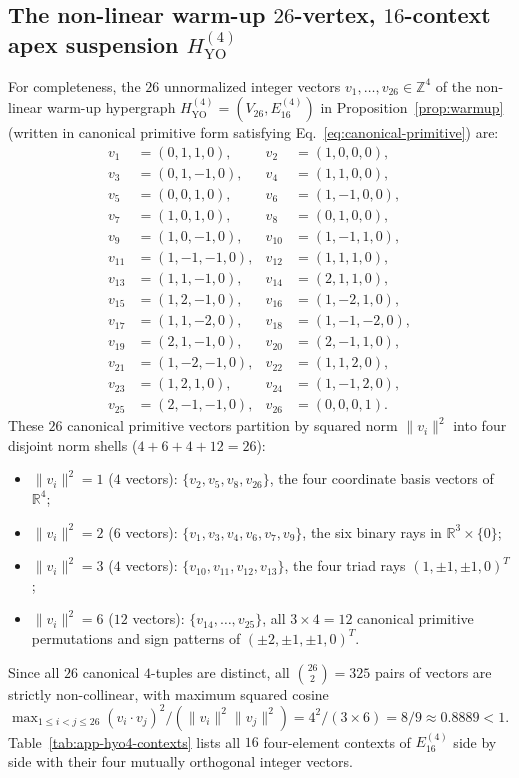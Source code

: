 \documentclass[
  aps,
  pra,
  reprint,
  superscriptaddress,
  amsmath,
  amssymb,
  nofootinbib,
  floatfix
]{revtex4-2}
\theoremstyle{definition}
\theoremstyle{remark}
\newcommand{\R}{\mathbb{R}}
\newcommand{\YO}{\mathrm{YO}}
\begin{document}
\subsection{The non-linear warm-up \texorpdfstring{$26$}{26}-vertex, \texorpdfstring{$16$}{16}-context apex suspension \texorpdfstring{$H_{\YO}^{(4)}$}{H\_YO\^(4)}}\label{app:hyo4}

For completeness, the $26$ unnormalized integer vectors $v_1,\ldots,v_{26}\in\mathbb{Z}^4$ of the non-linear warm-up hypergraph $H_{\YO}^{(4)}=(V_{26},E_{16}^{(4)})$ in Proposition~\ref{prop:warmup} (written in canonical primitive form satisfying Eq.~\eqref{eq:canonical-primitive}) are:
\begin{equation}\label{eq:hyo4-vectors}
\begin{aligned}
v_1&=(0,1,1,0),& v_2&=(1,0,0,0),\\
v_3&=(0,1,-1,0),& v_4&=(1,1,0,0),\\
v_5&=(0,0,1,0),& v_6&=(1,-1,0,0),\\
v_7&=(1,0,1,0),& v_8&=(0,1,0,0),\\
v_9&=(1,0,-1,0),& v_{10}&=(1,-1,1,0),\\
v_{11}&=(1,-1,-1,0),& v_{12}&=(1,1,1,0),\\
v_{13}&=(1,1,-1,0),& v_{14}&=(2,1,1,0),\\
v_{15}&=(1,2,-1,0),& v_{16}&=(1,-2,1,0),\\
v_{17}&=(1,1,-2,0),& v_{18}&=(1,-1,-2,0),\\
v_{19}&=(2,1,-1,0),& v_{20}&=(2,-1,1,0),\\
v_{21}&=(1,-2,-1,0),& v_{22}&=(1,1,2,0),\\
v_{23}&=(1,2,1,0),& v_{24}&=(1,-1,2,0),\\
v_{25}&=(2,-1,-1,0),& v_{26}&=(0,0,0,1).
\end{aligned}
\end{equation}
These $26$ canonical primitive vectors partition by squared norm $\|v_i\|^2$ into four disjoint norm shells ($4+6+4+12=26$):
\begin{itemize}
\item $\|v_i\|^2=1$ ($4$ vectors): $\{v_2,v_5,v_8,v_{26}\}$, the four coordinate basis vectors of $\R^4$;
\item $\|v_i\|^2=2$ ($6$ vectors): $\{v_1,v_3,v_4,v_6,v_7,v_9\}$, the six binary rays in $\R^3\times\{0\}$;
\item $\|v_i\|^2=3$ ($4$ vectors): $\{v_{10},v_{11},v_{12},v_{13}\}$, the four triad rays $(1,\pm1,\pm1,0)^T$;
\item $\|v_i\|^2=6$ ($12$ vectors): $\{v_{14},\ldots,v_{25}\}$, all $3\times 4=12$ canonical primitive permutations and sign patterns of $(\pm2,\pm1,\pm1,0)^T$.
\end{itemize}
Since all $26$ canonical $4$-tuples are distinct, all $\binom{26}{2}=325$ pairs of vectors are strictly non-collinear, with maximum squared cosine $\max_{1\le i<j\le 26}(v_i\cdot v_j)^2/(\|v_i\|^2\|v_j\|^2)=4^2/(3\times 6)=8/9\approx 0.8889<1$. Table~\ref{tab:app-hyo4-contexts} lists all $16$ four-element contexts of $E_{16}^{(4)}$ side by side with their four mutually orthogonal integer vectors.
\end{document}
